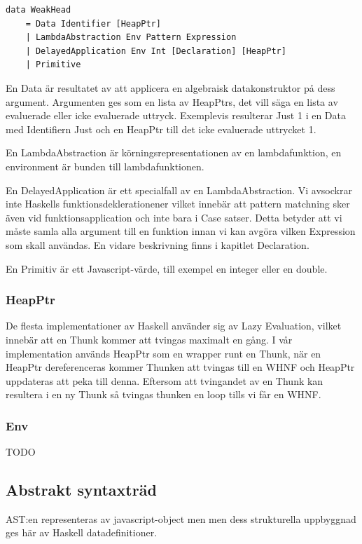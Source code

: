 \begin{lstlisting}
data WeakHead 
    = Data Identifier [HeapPtr]
    | LambdaAbstraction Env Pattern Expression
    | DelayedApplication Env Int [Declaration] [HeapPtr]
    | Primitive
\end{lstlisting}

En Data är resultatet av att applicera en algebraisk datakonstruktor på dess argument. Argumenten ges som en lista av HeapPtrs, det vill säga en lista av evaluerade eller icke evaluerade uttryck. Exemplevis resulterar Just 1 i en Data med Identifiern Just och en HeapPtr till det icke evaluerade uttrycket 1.

En LambdaAbstraction är körningsrepresentationen av en lambdafunktion, en environment är bunden till lambdafunktionen.

En DelayedApplication är ett specialfall av en LambdaAbstraction. Vi avsockrar inte Haskells funktionsdeklerationener vilket innebär att pattern matchning sker även vid funktionsapplication och inte bara i Case satser. Detta betyder att vi måste samla alla argument till en funktion innan vi kan avgöra vilken Expression som skall användas. En vidare beskrivning finns i kapitlet Declaration.

En Primitiv är ett Javascript-värde, till exempel en integer eller en double.

\subsubsection{HeapPtr}
De flesta implementationer av Haskell använder sig av Lazy Evaluation, vilket innebär att en Thunk kommer att tvingas maximalt en gång. I vår implementation används HeapPtr som en wrapper runt en Thunk, när en HeapPtr dereferenceras kommer Thunken att tvingas till en WHNF och HeapPtr uppdateras att peka till denna. Eftersom att tvingandet av en Thunk kan resultera i en ny Thunk så tvingas thunken en loop tills vi får en WHNF.

\subsubsection{Env}
TODO

\subsection{Abstrakt syntaxträd} 
AST:en representeras av javascript-object men men dess strukturella uppbyggnad ges här av Haskell datadefinitioner.

